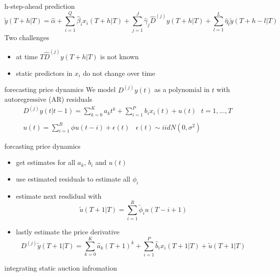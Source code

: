 \documentclass[hyperref={pdfpagelabels=false}]{beamer}
\begin{document}
\begin{frame}{h-step-ahead prediction}
\small
\begin{equation}
\tilde{y}(T+h|T)=\hat{\alpha}+\sum_{i=1}^{Q}\hat{\beta}_ix_i(T+h|T)+\sum_{j=1}^J\hat{\gamma}_j\hat{D}^{(j)}y(T+h|T)+\sum_{l=1}^L\hat{\eta}_l\tilde{y}(T+h-l|T) \nonumber
\end{equation}
\normalsize
\newline
Two challenges
\begin{itemize}
	\item at time $T \hat{D}^{(j)}y(T+h|T)$ is not known
	\item static predictors in $x_i$ do not change over time
\end{itemize}
\end{frame}

\begin{frame}{forecasting price dynamics}
We model $D^{(j)}y(t)$ as a polynomial in $t$ with autoregressive (AR) residuals
\begin{align}
D^{(j)}y(t|t-1) =\sum_{k=0}^Ka_kt^k+\sum_{i=1}^Pb_ix_i(t)+u(t) \ \ \ t=1,...,T \nonumber \\ \\ u(t)=\sum_{i=1}^R\phi u(t-i)+\epsilon(t) \ \ \ \ \epsilon(t) \sim iidN(0,\sigma^2)
\end{align} 
\end{frame}

\begin{frame}{forcasting price dynamics}
\begin{itemize}
	\item get estimates for all $a_k$, $b_i$ and $u(t)$
	\item use estimated residuals to estimate all $\phi_i$
	\item estimate next resdidual with \begin{equation}  \tilde{u}(T+1|T)=\sum_{i=1}^R\tilde{\phi}_iu(T-i+1) \nonumber \end{equation}
	\item lastly estimate the price derivative \begin{equation} D^{(j)}\tilde{y}(T+1|T) =\sum_{k=0}^K\hat{a}_k(T+1)^k+\sum_{i=1}^P\hat{b}_ix_i(T+1|T)+\tilde{u}(T+1|T) \nonumber \end{equation}
\end{itemize}	
\end{frame}

\begin{frame}{integrating static auction infromation}

\end{frame}

\begin{frame}

\end{frame}
\end{document}
